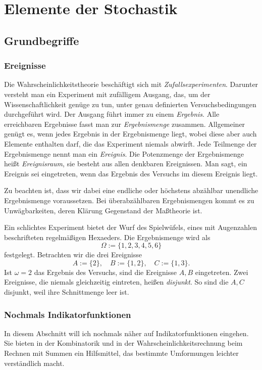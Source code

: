 
\chapter{Elemente der Stochastik}

\section{Grundbegriffe}

\subsection{Ereignisse}

Die Wahrscheinlichkeitstheorie beschäftigt sich mit
\emph{Zufallsexperimenten}. Darunter versteht man ein Experiment
mit zufälligem Ausgang, das, um der Wissenschaftlichkeit genüge zu tun,
unter genau definierten Versuchsbedingungen durchgeführt wird.
Der Ausgang führt immer zu einem \emph{Ergebnis}. Alle erreichbaren
Ergebnisse fasst man zur \emph{Ergebnismenge} zusammen. Allgemeiner
genügt es, wenn jedes Ergebnis in der Ergebnismenge liegt, wobei diese
aber auch Elemente enthalten darf, die das Experiment niemals abwirft.
Jede Teilmenge der Ergebnismenge nennt man ein \emph{Ereignis}.
Die Potenzmenge der Ergebnismenge heißt \emph{Ereignisraum}, sie
besteht aus allen denkbaren Ereignissen. Man sagt, ein Ereignis sei
eingetreten, wenn das Ergebnis des Versuchs im diesem Ereignis liegt.

Zu beachten ist, dass wir dabei eine endliche oder höchstens
abzählbar unendliche Ergebnismenge voraussetzen. Bei überabzählbaren
Ergebnismengen kommt es zu Unwägbarkeiten, deren Klärung Gegenstand der
Maßtheorie ist.

Ein schlichtes Experiment bietet der Wurf des Spielwüfels, eines mit
Augenzahlen beschrifteten regelmäßigen Hexaeders. Die Ergebnismenge
wird als
\[\Omega := \{1, 2, 3, 4, 5, 6\}\]
festgelegt. Betrachten wir die drei Ereignisse
\[A := \{2\},\quad B := \{1,2\},\quad C:=\{1,3\}.\]
Ist $\omega=2$ das Ergebnis des Versuchs, sind die Ereignisse $A,B$
eingetreten. Zwei Ereignisse, die niemals gleichzeitig eintreten,
heißen \emph{disjunkt}. So sind die $A,C$ disjunkt, weil ihre
Schnittmenge leer ist.

\subsection{Nochmals Indikatorfunktionen}

In diesem Abschnitt will ich nochmals näher auf Indikatorfunktionen
eingehen. Sie bieten in der Kombinatorik und in der
Wahrscheinlichkeitsrechnung beim Rechnen mit Summen ein Hilfsmittel,
das bestimmte Umformungen leichter verständlich macht.

